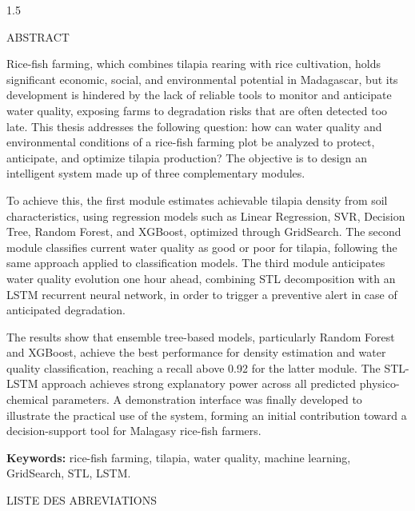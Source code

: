 \documentclass[a4paper,12pt, oneside]{article}
\begin{document}
\vspace*{\fill}
\newpage
\begin{spacing}{1.5}
\begin{center}
\LARGE{ABSTRACT}
\end{center}
Rice-fish farming, which combines tilapia rearing with rice cultivation, holds significant economic, social, and environmental potential in Madagascar, but its development is hindered by the lack of reliable tools to monitor and anticipate water quality, exposing farms to degradation risks that are often detected too late. This thesis addresses the following question: how can water quality and environmental conditions of a rice-fish farming plot be analyzed to protect, anticipate, and optimize tilapia production? The objective is to design an intelligent system made up of three complementary modules.

To achieve this, the first module estimates achievable tilapia density from soil characteristics, using regression models such as Linear Regression, SVR, Decision Tree, Random Forest, and XGBoost, optimized through GridSearch. The second module classifies current water quality as good or poor for tilapia, following the same approach applied to classification models. The third module anticipates water quality evolution one hour ahead, combining STL decomposition with an LSTM recurrent neural network, in order to trigger a preventive alert in case of anticipated degradation.

The results show that ensemble tree-based models, particularly Random Forest and XGBoost, achieve the best performance for density estimation and water quality classification, reaching a recall above 0.92 for the latter module. The STL-LSTM approach achieves strong explanatory power across all predicted physico-chemical parameters. A demonstration interface was finally developed to illustrate the practical use of the system, forming an initial contribution toward a decision-support tool for Malagasy rice-fish farmers.

\vspace{0.5cm}
\textbf{Keywords:} rice-fish farming, tilapia, water quality, machine learning, GridSearch, STL, LSTM.
\end{spacing}

\vspace*{\fill}
\newpage

\tableofcontents
\vspace*{\fill}
\newpage

\begin{center}
\Large LISTE DES ABREVIATIONS
\end{center}
\end{document}
